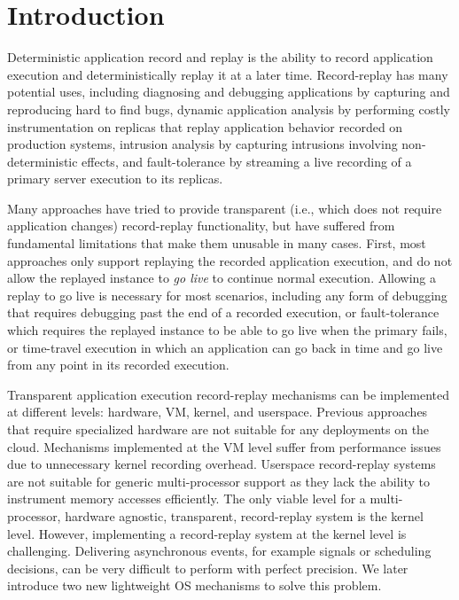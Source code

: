\chapter{Introduction}
\label{ch:intro}

Deterministic application record and replay is the ability to record application
execution and deterministically replay it at a later time.  Record-replay has
many potential uses, including diagnosing and debugging applications by
capturing and reproducing hard to find bugs, dynamic application analysis by
performing costly instrumentation on replicas that replay application behavior
recorded on production systems, intrusion analysis by capturing intrusions
involving non-deterministic effects, and fault-tolerance by streaming
a live recording of a primary server execution to its replicas.

Many approaches have tried to provide transparent (i.e., which does not require
application changes) record-replay functionality, but have suffered from
fundamental limitations that make them unusable in many cases.  First, most
approaches only support replaying the recorded application execution, and do not
allow the replayed instance to {\em go live} to continue normal execution.
Allowing a replay to go live is necessary for most scenarios, including
any form of debugging that requires debugging past the end of a recorded execution,
or fault-tolerance which requires the replayed instance to be able to go live
when the primary fails, or time-travel execution in which an application can go
back in time and go live from any point in its recorded execution.

Transparent application execution record-replay mechanisms can be implemented at different levels:
hardware, VM, kernel, and userspace. Previous approaches that require
specialized hardware are not suitable for any deployments on the cloud.
Mechanisms implemented at the VM level suffer from performance issues
due to unnecessary kernel recording overhead.  Userspace record-replay systems
are not suitable for generic multi-processor support as they lack the ability to
instrument memory accesses efficiently. The only viable level for
a multi-processor, hardware agnostic, transparent, record-replay system is the
kernel level. However, implementing a record-replay system at the kernel level
is challenging. Delivering asynchronous events, for example signals or
scheduling decisions, can be very difficult to perform with perfect precision.
We later introduce two new lightweight OS mechanisms to solve this problem.

